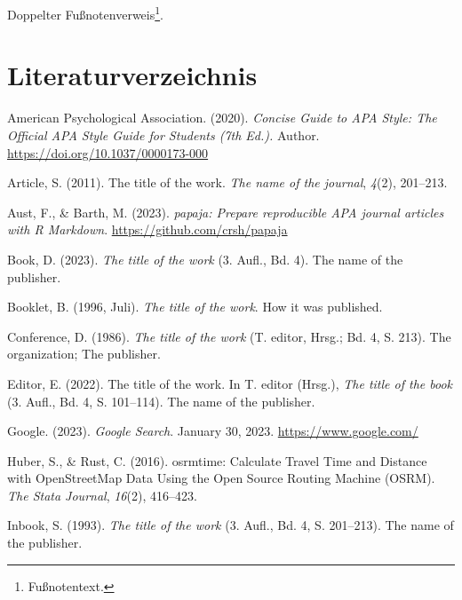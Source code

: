 \documentclass[
  stu,
  floatsintext,
  longtable,
  a4paper,
  nolmodern,
  notxfonts,
  notimes,
  donotrepeattitle,
  colorlinks=true,linkcolor=blue,citecolor=blue,urlcolor=blue]{apa7}
\newlength{\cslhangindent}
\newenvironment{CSLReferences}[2] %
 {\begin{list}{}{%
  \setlength{\itemindent}{0pt}
  \setlength{\leftmargin}{0pt}
  \setlength{\parsep}{0pt}
  \ifodd #1
   \setlength{\leftmargin}{\cslhangindent}
   \setlength{\itemindent}{-1\cslhangindent}
  \fi
  \setlength{\itemsep}{#2\baselineskip}}}
 {\end{list}}
\begin{document}
Doppelter Fußnotenverweis\footnote{Fußnotentext.}.

\newpage

\section*{Literaturverzeichnis}\label{literaturverzeichnis}

\label{refs}
\begin{CSLReferences}{1}{0}
American Psychological Association. (2020). \emph{Concise Guide to {APA
Style}: {The} Official {APA Style} Guide for Students (7th Ed.).}
Author. \url{https://doi.org/10.1037/0000173-000}

Article, S. (2011). The title of the work. \emph{The name of the
journal}, \emph{4}(2), 201--213.

Aust, F., \& Barth, M. (2023). \emph{{papaja}: {Prepare} reproducible
{APA} journal articles with {R} Markdown}.
\url{https://github.com/crsh/papaja}

Book, D. (2023). \emph{The title of the work} (3. Aufl., Bd. 4). The
name of the publisher.

Booklet, B. (1996, Juli). \emph{The title of the work}. How it was
published.

Conference, D. (1986). \emph{The title of the work} (T. editor, Hrsg.;
Bd. 4, S. 213). The organization; The publisher.

Editor, E. (2022). The title of the work. In T. editor (Hrsg.),
\emph{The title of the book} (3. Aufl., Bd. 4, S. 101--114). The name of
the publisher.

Google. (2023). \emph{Google Search}. January 30, 2023.
\url{https://www.google.com/}

Huber, S., \& Rust, C. (2016). osrmtime: Calculate Travel Time and
Distance with {OpenStreetMap} Data Using the {Open Source Routing
Machine} ({OSRM}). \emph{The Stata Journal}, \emph{16}(2), 416--423.

Inbook, S. (1993). \emph{The title of the work} (3. Aufl., Bd. 4, S.
201--213). The name of the publisher.


\end{CSLReferences}
\end{document}
